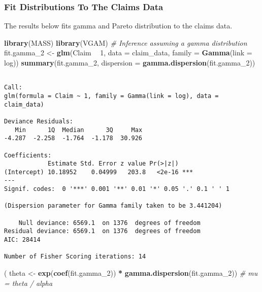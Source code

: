 \documentclass[]{book}
\newenvironment{Shaded}{\begin{snugshade}}{\end{snugshade}}
\newcommand{\KeywordTok}[1]{\textcolor[rgb]{0.13,0.29,0.53}{\textbf{#1}}}
\newcommand{\DataTypeTok}[1]{\textcolor[rgb]{0.13,0.29,0.53}{#1}}
\newcommand{\DecValTok}[1]{\textcolor[rgb]{0.00,0.00,0.81}{#1}}
\newcommand{\StringTok}[1]{\textcolor[rgb]{0.31,0.60,0.02}{#1}}
\newcommand{\CommentTok}[1]{\textcolor[rgb]{0.56,0.35,0.01}{\textit{#1}}}
\newcommand{\OperatorTok}[1]{\textcolor[rgb]{0.81,0.36,0.00}{\textbf{#1}}}
\newcommand{\NormalTok}[1]{#1}
\theoremstyle{definition}
\theoremstyle{definition}
\theoremstyle{definition}
\theoremstyle{remark}
\begin{document}
\subsubsection{Fit Distributions To The Claims
Data}\label{fit-distributions-to-the-claims-data}

The results below fits gamma and Pareto distribution to the claims data.

\begin{Shaded}
\begin{Highlighting}[]
\KeywordTok{library}\NormalTok{(MASS)}
\KeywordTok{library}\NormalTok{(VGAM)}
\CommentTok{# Inference assuming a gamma distribution}
\NormalTok{fit.gamma_}\DecValTok{2}\NormalTok{ <-}\StringTok{ }\KeywordTok{glm}\NormalTok{(Claim }\OperatorTok{~}\StringTok{ }\DecValTok{1}\NormalTok{, }\DataTypeTok{data =}\NormalTok{ claim_data, }\DataTypeTok{family =} \KeywordTok{Gamma}\NormalTok{(}\DataTypeTok{link =}\NormalTok{ log)) }
\KeywordTok{summary}\NormalTok{(fit.gamma_}\DecValTok{2}\NormalTok{, }\DataTypeTok{dispersion =} \KeywordTok{gamma.dispersion}\NormalTok{(fit.gamma_}\DecValTok{2}\NormalTok{)) }
\end{Highlighting}
\end{Shaded}

\begin{verbatim}

Call:
glm(formula = Claim ~ 1, family = Gamma(link = log), data = claim_data)

Deviance Residuals: 
   Min      1Q  Median      3Q     Max  
-4.287  -2.258  -1.764  -1.178  30.926  

Coefficients:
            Estimate Std. Error z value Pr(>|z|)    
(Intercept) 10.18952    0.04999   203.8   <2e-16 ***
---
Signif. codes:  0 '***' 0.001 '**' 0.01 '*' 0.05 '.' 0.1 ' ' 1

(Dispersion parameter for Gamma family taken to be 3.441204)

    Null deviance: 6569.1  on 1376  degrees of freedom
Residual deviance: 6569.1  on 1376  degrees of freedom
AIC: 28414

Number of Fisher Scoring iterations: 14
\end{verbatim}

\begin{Shaded}
\begin{Highlighting}[]
\NormalTok{( theta <-}\StringTok{ }\KeywordTok{exp}\NormalTok{(}\KeywordTok{coef}\NormalTok{(fit.gamma_}\DecValTok{2}\NormalTok{)) }\OperatorTok{*}\StringTok{ }\KeywordTok{gamma.dispersion}\NormalTok{(fit.gamma_}\DecValTok{2}\NormalTok{))  }\CommentTok{# mu = theta / alpha}
\end{Highlighting}
\end{Shaded}
\end{document}
